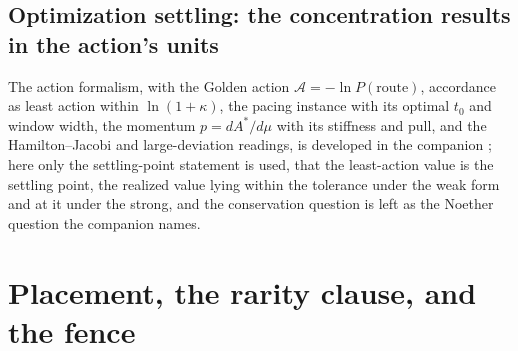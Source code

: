 \documentclass[11pt]{article}
\theoremstyle{definition}
\begin{document}
\subsection{Optimization settling: the concentration results in the action's units}\label{sec:action-units}

The action formalism, with the Golden action $\mathcal{A} = -\ln P(\text{route})$, accordance as least action within $\ln(1+\kappa)$, the pacing instance with its optimal $t_0$ and window width, the momentum $p = dA^*/d\mu$ with its stiffness and pull, and the Hamilton--Jacobi and large-deviation readings, is developed in the companion \cite{Nexus}; here only the settling-point statement is used, that the least-action value is the settling point, the realized value lying within the tolerance under the weak form and at it under the strong, and the conservation question is left as the Noether question the companion names.


\section{Placement, the rarity clause, and the fence}\label{sec:placement}
\end{document}
